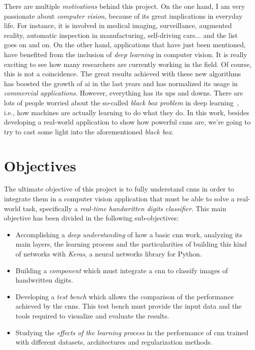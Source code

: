 There are multiple \emph{motivations} behind this project. On the one hand, I am very passionate about \emph{computer vision}, because of its great implications in everyday life. For instance, it is involved in medical imaging, surveillance, augmented reality, automatic inspection in manufacturing, self-driving cars... and the list goes on and on. On the other hand, applications that have just been mentioned, have benefited from the inclusion of \emph{deep learning} in computer vision. It is really exciting to see how many researchers are currently working in the field. Of course, this is not a coincidence. The great results achieved with these new algorithms has boosted the growth of \gls{ai} in the last years and has normalized its usage in \emph{commercial applications}. However, everything has its ups and downs. There are lots of people worried about the so-called \emph{\textit{black box} problem} in deep learning~\cite{black-box}, i.e., how machines are actually learning to do what they do. In this work, besides developing a real-world application to show how powerful \glspl{cnn} are, we're going to try to cast some light into the aforementioned \textit{black box}. 

\section{Objectives}\label{sec:objectives}
The ultimate objective of this project is to fully understand \glspl{cnn} in order to integrate them in a computer vision application that must be able to solve a real-world task, specifically a \emph{real-time handwritten digits classifier}. This main objective has been divided in the following sub-objectives: 
\begin{itemize}
	\item Accomplishing a \emph{deep understanding} of how a basic \gls{cnn} work, analyzing its main layers, the learning process and the particularities of building this kind of networks with \emph{Keras}, a neural networks library for Python.
	\item Building a \emph{component} which must integrate a \gls{cnn} to classify images of handwritten digits.
	\item Developing a \emph{test bench} which allows the comparison of the performance achieved by the \glspl{cnn}. This test bench must provide the input data and the tools required to visualize and evaluate the results.
	\item Studying the \emph{effects of the learning process} in the performance of \gls{cnn} trained with different datasets, architectures and regularization methods.
\end{itemize}

